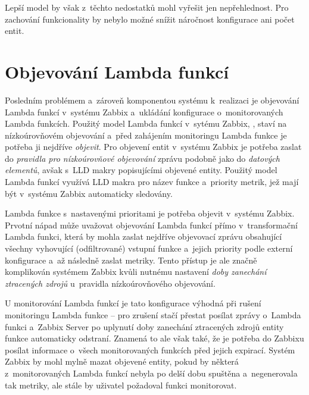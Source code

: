 \documentclass[czech, ing, kiv, he, iso690]{fasthesis}
\begin{document}
Lepší model by však z~těchto nedostatků mohl vyřešit jen nepřehlednost. Pro zachování funkcionality by nebylo možné snížit náročnost konfigurace ani počet entit.

\section{Objevování Lambda funkcí}
\label{sec:lambda-discovery}
Posledním problémem a~zároveň komponentou systému k~realizaci je objevování Lambda funkcí v~systému Zabbix a~ukládání konfigurace o~monitorovaných Lambda funkcích. Použitý model Lambda funkcí v~sytému Zabbix, , staví na nízkoúrovňovém objevování a~před zahájením monitoringu Lambda funkce je potřeba ji nejdříve \emph{objevit}. Pro objevení entit v~systému Zabbix je potřeba zaslat do \emph{pravidla pro nízkoúrovňové objevování} zprávu podobně jako do \emph{datových elementů}, avšak s~LLD makry popisujícími objevené entity. Použitý model Lambda funkcí využívá LLD makra pro název funkce a~priority metrik, jež mají být v~systému Zabbix automaticky sledovány. 

Lambda funkce s~nastavenými prioritami je potřeba objevit v~systému Zabbix. Prvotní nápad může uvažovat objevování Lambda funkcí přímo v~transformační Lambda funkci, která by mohla zaslat nejdříve objevovací zprávu obsahující všechny vyhovující (odfiltrované) vstupní funkce a~jejich priority podle externí konfigurace a~až následně zaslat metriky. Tento přístup je ale značně komplikován systémem Zabbix kvůli nutnému nastavení \emph{doby zanechání ztracených zdrojů} u~pravidla nízkoúrovňového objevování. 

U monitorování Lambda funkcí je tato konfigurace výhodná při rušení monitoringu Lambda funkce -- pro zrušení stačí přestat posílat zprávy o~Lambda funkci a~Zabbix Server po uplynutí doby zanechání ztracených zdrojů entity funkce automaticky odstraní. Znamená to ale však také, že je potřeba do Zabbixu posílat informace o~všech monitorovaných funkcích před jejich expirací. Systém Zabbix by mohl mylně mazat objevené entity, pokud by některá z~monitorovaných Lambda funkcí nebyla po delší dobu spuštěna a~negenerovala tak metriky, ale stále by uživatel požadoval funkci monitorovat. 
\end{document}
